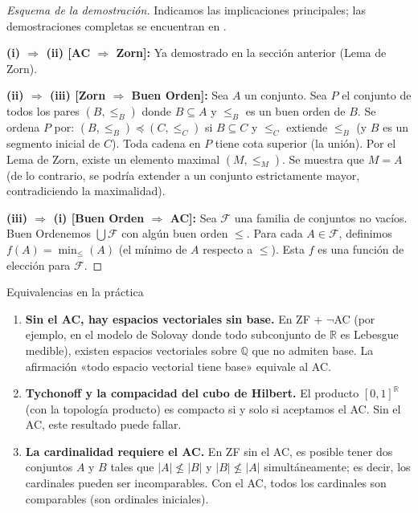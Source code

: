 \begin{proof}[Esquema de la demostración]
Indicamos las implicaciones principales; las demostraciones completas se encuentran en \cite{jech2003, kunen2011}.

\medskip
\textbf{(i) $\Rightarrow$ (ii) [AC $\Rightarrow$ Zorn]:} Ya demostrado en la sección anterior (Lema de Zorn).

\medskip
\textbf{(ii) $\Rightarrow$ (iii) [Zorn $\Rightarrow$ Buen Orden]:} Sea $A$ un conjunto. Sea $P$ el conjunto de todos los pares $(B, \leq_B)$ donde $B \subseteq A$ y $\leq_B$ es un buen orden de $B$. Se ordena $P$ por: $(B, \leq_B) \preceq (C, \leq_C)$ si $B \subseteq C$ y $\leq_C$ extiende $\leq_B$ (y $B$ es un segmento inicial de $C$). Toda cadena en $P$ tiene cota superior (la unión). Por el Lema de Zorn, existe un elemento maximal $(M, \leq_M)$. Se muestra que $M = A$ (de lo contrario, se podría extender a un conjunto estrictamente mayor, contradiciendo la maximalidad).

\medskip
\textbf{(iii) $\Rightarrow$ (i) [Buen Orden $\Rightarrow$ AC]:} Sea $\mathcal{F}$ una familia de conjuntos no vacíos. Buen Ordenemos $\bigcup \mathcal{F}$ con algún buen orden $\leq$. Para cada $A \in \mathcal{F}$, definimos $f(A) = \min_{\leq}(A)$ (el mínimo de $A$ respecto a $\leq$). Esta $f$ es una función de elección para $\mathcal{F}$.
\end{proof}

\begin{ejemplo}{Equivalencias en la práctica}{}
\begin{enumerate}[leftmargin=2em, label=(\alph*)]
  \item \textbf{Sin el AC, hay espacios vectoriales sin base.} En ZF + $\neg$AC (por ejemplo, en el modelo de Solovay donde todo subconjunto de $\mathbb{R}$ es Lebesgue medible), existen espacios vectoriales sobre $\mathbb{Q}$ que no admiten base. La afirmación «todo espacio vectorial tiene base» equivale al AC.

  \item \textbf{Tychonoff y la compacidad del cubo de Hilbert.} El producto $[0,1]^{\mathbb{R}}$ (con la topología producto) es compacto si y solo si aceptamos el AC. Sin el AC, este resultado puede fallar.

  \item \textbf{La cardinalidad requiere el AC.} En ZF sin el AC, es posible tener dos conjuntos $A$ y $B$ tales que $|A| \not\leq |B|$ y $|B| \not\leq |A|$ simultáneamente; es decir, los cardinales pueden ser incomparables. Con el AC, todos los cardinales son comparables (son ordinales iniciales).
\end{enumerate}
\end{ejemplo}

